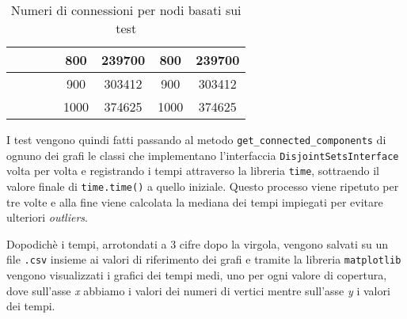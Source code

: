 \begin{table}[!h]
\begin{adjustbox}{center}
\begin{tabular}{|c|c|c|c|c|c|c|c|}
                                                         &                                          &                           &                            & 800     & 239700      & 800     & 239700      \\ \hline
                                                         &                                          &                           &                            & 900     & 303412      & 900     & 303412      \\ \hline
                                                         &                                          &                           &                            & 1000    & 374625      & 1000    & 374625      \\ \hline
            \end{tabular}
      \end{adjustbox}
      \caption{Numeri di connessioni per nodi basati sui test}
      \label{covTable}
\end{table}

I test vengono quindi fatti passando al metodo \texttt{get\_connected\_components} di ognuno dei grafi le classi che implementano
l'interfaccia \texttt{DisjointSetsInterface} volta per volta e registrando i tempi attraverso la libreria \texttt{time}, sottraendo
il valore finale di \texttt{time.time()} a quello iniziale. Questo processo viene ripetuto per tre volte e alla fine viene calcolata
la mediana dei tempi impiegati per evitare ulteriori \textit{outliers}.\newline

Dopodichè i tempi, arrotondati a 3 cifre dopo la virgola, vengono salvati su un file \texttt{.csv} insieme ai valori di riferimento dei grafi e tramite la libreria \texttt{matplotlib}
vengono visualizzati i grafici dei tempi medi, uno per ogni valore di copertura, dove sull'asse \textit{x} abbiamo i valori dei numeri di vertici mentre
sull'asse \textit{y} i valori dei tempi.


